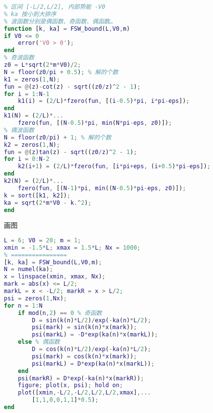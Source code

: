 \begin{lstlisting}[language=matlab, caption=FSW\_bound.m]
% 有限深势阱的束缚态
% 区间 [-L/2,L/2], 内部势能 -V0
% ka 按小到大排序
% 波函数分别是偶函数、奇函数、偶函数…
function [k, ka] = FSW_bound(L,V0,m)
if V0 <= 0
    error('V0 > 0');
end
% 奇波函数
z0 = L*sqrt(2*m*V0)/2;
N = floor(z0/pi + 0.5); % 解的个数
k1 = zeros(1,N);
fun = @(z)-cot(z) - sqrt((z0/z)^2 - 1);
for i = 1:N-1
    k1(i) = (2/L)*fzero(fun, [(i-0.5)*pi, i*pi-eps]);
end
k1(N) = (2/L)*...
    fzero(fun, [(N-0.5)*pi, min(N*pi-eps, z0)]);
% 偶波函数
N = floor(z0/pi) + 1; % 解的个数
k2 = zeros(1,N);
fun = @(z)tan(z) - sqrt((z0/z)^2 - 1);
for i = 0:N-2
    k2(i+1) = (2/L)*fzero(fun, [i*pi+eps, (i+0.5)*pi-eps]);
end
k2(N) = (2/L)*...
    fzero(fun, [(N-1)*pi, min((N-0.5)*pi-eps, z0)]);
k = sort([k1, k2]);
ka = sqrt(2*m*V0 - k.^2);
end
\end{lstlisting}

画图
\begin{lstlisting}[language=matlab, caption=FSW\_bound\_demo.m]
% === 参数设置 ===
L = 6; V0 = 20; m = 1;
xmin = -1.5*L; xmax = 1.5*L; Nx = 1000;
% ================
[k, ka] = FSW_bound(L,V0,m);
N = numel(ka);
x = linspace(xmin, xmax, Nx);
mark = abs(x) <= L/2;
markL = x < -L/2; markR = x > L/2;
psi = zeros(1,Nx);
for n = 1:N
    if mod(n,2) == 0 % 奇函数
        D = sin(k(n)*L/2)/exp(-ka(n)*L/2);
        psi(mark) = sin(k(n)*x(mark));
        psi(markL) = -D*exp(ka(n)*x(markL));
    else % 偶函数
        D = cos(k(n)*L/2)/exp(-ka(n)*L/2);
        psi(mark) = cos(k(n)*x(mark));
        psi(markL) = D*exp(ka(n)*x(markL));
    end
    psi(markR) = D*exp(-ka(n)*x(markR));
    figure; plot(x, psi); hold on;
    plot([xmin,-L/2,-L/2,L/2,L/2,xmax],...
        [1,1,0,0,1,1]*0.5);
end
\end{lstlisting}
